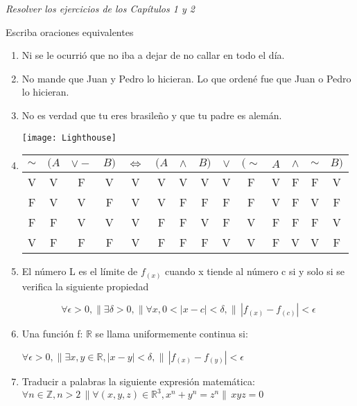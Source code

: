 \documentclass{article}
\date{}
\begin{document}
\maketitle
{\Large \it {Resolver los ejercicios de los Capítulos 1 y 2}}

Escriba oraciones equivalentes

\begin {enumerate}
\item
Ni se le ocurrió que no iba a dejar de no callar en todo el día.

\item
No mande que Juan y Pedro lo hicieran. Lo que ordené fue que Juan o Pedro lo hicieran.

\item
No es verdad que tu eres brasileño y que tu padre es alemán.

\begin{center}
\texttt{[image: Lighthouse]}
\end{center}


\item
\begin{tabular}{|c|c|c|c|c|c|c|c|c|c|c|c|c|c|} \hline
$\sim$ & $(A$ & $\vee -$ & $B)$ & $\Longleftrightarrow$ & $(A$ & $\wedge$ & $B)$ & $\vee$ & $(\sim$ & $A$ & $\wedge$& $\sim$ & $B)$  \\ \hline
V & V & F & V & V & V & V & V & V & F & V & F & F & V\\
F & V & V & F & V & V & F & F & F & F & V & F & V & F\\
F & F & V & V & V & F & F & V & F & V & F & F & F & V\\
V & F & F & F & V & F & F & F & V & V  & F & V & V & F\\ \hline
\end{tabular}

\item

El número L es el límite de $f_{(x)}$ cuando x tiende al número c si y solo si se verifica la siguiente propiedad

$$\forall\epsilon > 0, \| \exists \delta > 0,  \| \forall x, 0 < |x - c|< \delta, \| \, |f_{(x)} - f_{(c)}| < \epsilon$$

\item
Una función f: $\mathbb{R} $ se llama uniformemente continua si:

$\forall \epsilon > 0, \| \exists x, y \in  \mathbb{R}, |x - y|< \delta, \| \, |f_{(x)} - f_{(y)}| < \epsilon$

\item
Traducir a palabras la siguiente expresión matemática: $\forall n\in \mathbb {Z}, n>2 \, \| \forall (x, y, z) \in  \mathbb{R}^3, x^n + y^n = z^n \| \, xyz = 0$


\end{enumerate}
\end{document}
